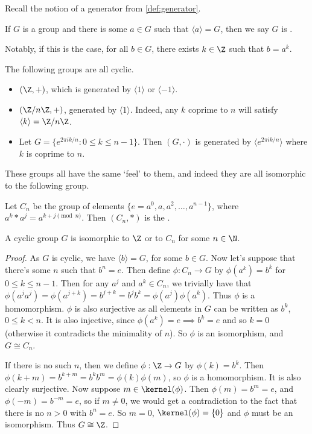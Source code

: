 
Recall the notion of a generator from \autoref{def:generator}.

\begin{definition}[Cyclic]
	If $G$ is a group and there is some $a \in G$ such that $\langle a \rangle = G$, then we say $G$ is . 
\end{definition}
Notably, if this is the case, for all $b \in G$, there exists $k \in \Z$ such that $b = a^k$.

\begin{example}
	The following groups are all cyclic.
	\begin{itemize}
		\item $(\Z, +)$, which is generated by $\langle 1 \rangle$ or $\langle -1 \rangle$.
		\item $(\Z/n\Z, +)$, generated by $\langle 1 \rangle$. Indeed, any $k$ coprime to $n$ will satisfy $\langle k \rangle = \Z/n\Z$.
		\item Let $G = \{ e^{2 \pi i k/n}  : 0 \leq k \leq n - 1 \}$. Then $(G, \cdot)$ is generated by $\langle e^{2 \pi i k/n}\rangle$ where $k$ is coprime to $n$.
	\end{itemize}
\end{example}
These groups all have the same `feel' to them, and indeed they are all isomorphic to the following group.

\begin{definition}
	Let $C_n$ be the group of elements $\{e = a^0, a, a^2, \dots, a^{n - 1}\}$, where $a^k * a^j = a^{k + j \pmod{n}}$. Then $(C_n, *)$ is the .
\end{definition}

\begin{theorem}
	A cyclic group $G$ is isomorphic to $\Z$ or to $C_n$ for some $n \in \N$.
\end{theorem}
\begin{proof}
	As $G$ is cyclic, we have $\langle b \rangle = G$, for some $b \in G$.
	Now let's suppose that there's some $n$ such that $b^n = e$. Then define $\phi: C_n \rightarrow G$ by $\phi(a^k) = b^k$ for $0 \leq k \leq n - 1$.
	Then for any $a^j$ and $a^k \in C_n$, we trivially have that $\phi(a^j a^j) = \phi(a^{j + k}) = b^{j + k} = b^j b^k = \phi(a^j) \phi(a^k)$. Thus $\phi$ is a homomorphism.
	$\phi$ is also surjective as all elements in $G$ can be written as $b^k$, $0 \leq k < n$. It is also injective, since $\phi(a^k) = e \implies b^k = e$ and so $k = 0$ (otherwise it contradicts the minimality of $n$). So $\phi$ is an isomorphism, and $G \cong C_n$.

	If there is no such $n$, then we define $\phi : \Z \rightarrow G$ by $\phi(k) = b^k$. Then $\phi(k + m) = b^{k + m} = b^k b^m = \phi(k) \phi(m)$, so $\phi$ is a homomorphism. It is also clearly surjective.
	Now suppose $m \in \kernel(\phi)$. Then $\phi(m) = b^m = e$, and $\phi(-m) = b^{-m} = e$, so if $m \neq 0$, we would get a contradiction to the fact that there is no $n > 0$ with $b^n = e$. So $m = 0$, $\kernel(\phi) = \{0\}$ and $\phi$ must be an isomorphism. Thus $G \cong \Z$.
\end{proof}

